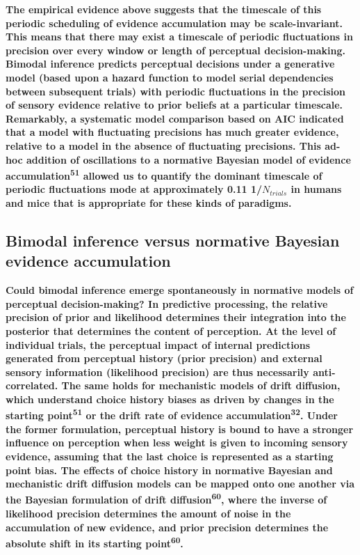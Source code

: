 \documentclass[
]{article}
\begin{document}
\textbf{The empirical evidence above suggests that the timescale of this
periodic scheduling of evidence accumulation may be scale-invariant.
This means that there may exist a timescale of periodic fluctuations in
precision over every window or length of perceptual decision-making.
Bimodal inference predicts perceptual decisions under a generative model
(based upon a hazard function to model serial dependencies between
subsequent trials) with periodic fluctuations in the precision of
sensory evidence relative to prior beliefs at a particular timescale.
Remarkably, a systematic model comparison based on AIC indicated that a
model with fluctuating precisions has much greater evidence, relative to
a model in the absence of fluctuating precisions. This ad-hoc addition
of oscillations to a normative Bayesian model of evidence
accumulation\textsuperscript{51} allowed us to quantify the dominant
timescale of periodic fluctuations mode at approximately 0.11
1/\(N_{trials}\) in humans and mice that is appropriate for these kinds
of paradigms.}

\hypertarget{bimodal-inference-versus-normative-bayesian-evidence-accumulation}{%
\subsection{Bimodal inference versus normative Bayesian evidence
accumulation}\label{bimodal-inference-versus-normative-bayesian-evidence-accumulation}}

\textbf{Could bimodal inference emerge spontaneously in normative models
of perceptual decision-making? In predictive processing, the relative
precision of prior and likelihood determines their integration into the
posterior that determines the content of perception. At the level of
individual trials, the perceptual impact of internal predictions
generated from perceptual history (prior precision) and external sensory
information (likelihood precision) are thus necessarily anti-correlated.
The same holds for mechanistic models of drift diffusion, which
understand choice history biases as driven by changes in the starting
point\textsuperscript{51} or the drift rate of evidence
accumulation\textsuperscript{32}. Under the former formulation,
perceptual history is bound to have a stronger influence on perception
when less weight is given to incoming sensory evidence, assuming that
the last choice is represented as a starting point bias. The effects of
choice history in normative Bayesian and mechanistic drift diffusion
models can be mapped onto one another via the Bayesian formulation of
drift diffusion\textsuperscript{60}, where the inverse of likelihood
precision determines the amount of noise in the accumulation of new
evidence, and prior precision determines the absolute shift in its
starting point\textsuperscript{60}.}
\end{document}
